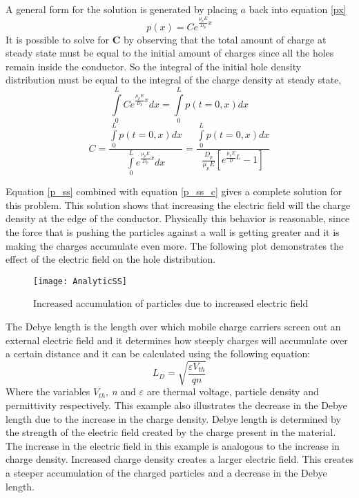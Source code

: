 \begin{doublespace}
A general form for the solution is generated by placing $a$ back into equation \eqref{px} 
\begin{equation}
p(x)=Ce^{\frac{\mu_{p} E}{D_{p}}x}
\label{p_ss}
\end{equation}
It is possible to solve for \textbf{C} by observing that the total amount of charge at steady state must be equal to the initial amount of charges since all the holes remain inside the conductor. So the integral of the initial hole density distribution must be equal to the integral of the charge density at steady state,
\begin{equation}\nonumber
\int\limits_{0}^{L}Ce^{\frac{\mu_{p} E}{D_{p}}x}dx=\int\limits_{0}^{L}p(t=0,x)dx
\end{equation}
\begin{equation}
C=\frac{\int\limits_{0}^{L}p(t=0,x)dx}{\int\limits_{0}^{L}e^{\frac{\mu_{p} E}{D_{p}}x}dx}
=\frac{\int\limits_{0}^{L}p(t=0,x)dx}{\frac{D_p}{\mu_p E}[e^{\frac{\mu_p E}{D} L} -1]}
\label{p_ss_c}
\end{equation}

Equation \ref{p_ss} combined with equation \ref{p_ss_c} gives a complete solution for this problem. This solution shows that increasing the electric field will  the  charge density at the edge of the conductor. Physically this behavior is reasonable, since the force that is pushing the particles against a wall is getting greater and it is making the charges accumulate even more. The following plot demonstrates the effect of the electric field on the hole distribution.
\begin{figure}[!htp]
\centering
\texttt{[image: AnalyticSS]}
\caption{Increased accumulation of particles due to increased electric field} 
\end{figure}

 The Debye length is the length over which mobile charge carriers screen out an external electric field and it determines how steeply charges will accumulate over a certain distance and it can be calculated using the following equation\cite{Dragica1}:
\begin{equation}
L_D=\sqrt{\frac{\varepsilon V_{th}}{q n}}
\end{equation}
Where the variables \textit{$V_{th}$}, \textit{n} and \textit{$\varepsilon$} are thermal voltage, particle density and permittivity respectively. This example also illustrates the decrease in the Debye length due to the increase in the charge density. Debye length is determined by the strength of the electric field created by the charge present in the material. The increase in the electric field in this example is analogous to the increase in charge density. Increased charge density creates a larger electric field. This creates a steeper accumulation of the charged particles and a decrease in the Debye length. 



\end{doublespace}
